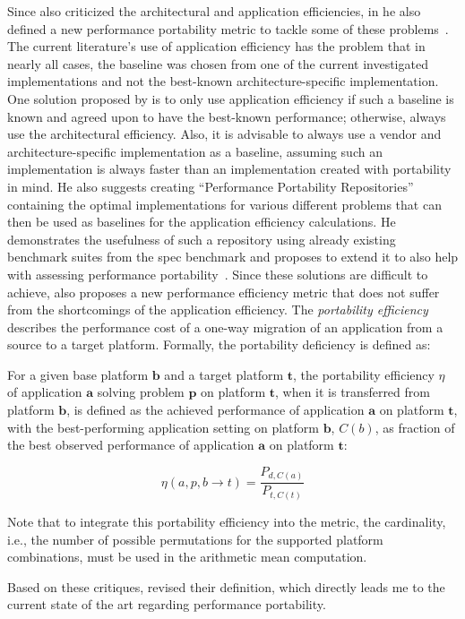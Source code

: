 Since \citeauthor{marowka_portability_2024} also criticized the architectural and application efficiencies, in \citeyear{marowka_portability_2024} he also defined a new performance portability metric to tackle some of these problems~\cite{marowka_portability_2024}. 
The current literature's use of application efficiency has the problem that in nearly all cases, the baseline was chosen from one of the current investigated implementations and not the best-known architecture-specific implementation. 
One solution proposed by \citeauthor{marowka_portability_2024} is to only use application efficiency if such a baseline is known and agreed upon to have the best-known performance; otherwise, always use the architectural efficiency. 
Also, it is advisable to always use a vendor and architecture-specific implementation as a baseline, assuming such an implementation is always faster than an implementation created with portability in mind. 
He also suggests creating \enquote{Performance Portability Repositories} containing the optimal implementations for various different problems that can then be used as baselines for the application efficiency calculations. 
He demonstrates the usefulness of such a repository using already existing benchmark suites from the \gls{spec} benchmark and proposes to extend it to also help with assessing performance portability~\cite{marowka_toward_2023}. 
Since these solutions are difficult to achieve, \citeauthor{marowka_portability_2024} also proposes a new performance efficiency metric that does not suffer from the shortcomings of the application efficiency.
The \textit{portability efficiency} describes the performance cost of a one-way migration of an application from a source to a target platform. 
Formally, the portability deficiency is defined as: 

\begin{definition}\label{def:pp_eff}
For a given base platform $\mathbf{b}$ and a target platform $\mathbf{t}$, the portability efficiency $\eta$ of application $\mathbf{a}$ solving problem $\mathbf{p}$ on platform $\mathbf{t}$, when it is transferred from platform $\mathbf{b}$, is defined as the achieved performance of application $\mathbf{a}$ on platform $\mathbf{t}$, with the best-performing application setting on platform $\mathbf{b}$, $C(b)$, as fraction of the best observed performance of application $\mathbf{a}$ on platform $\mathbf{t}$:

\[
    \eta(a, p, b \rightarrow t) = \frac{P_{d, C(a)}}{P_{t, C(t)}}
\]
\end{definition}
Note that to integrate this portability efficiency into the \mpp metric, the cardinality, i.e., the number of possible permutations for the supported platform combinations, must be used in the arithmetic mean computation. 

Based on these critiques, \citet{pennycook_revisiting_2021} revised their \pp definition, which directly leads me to the current state of the art regarding performance portability. 
